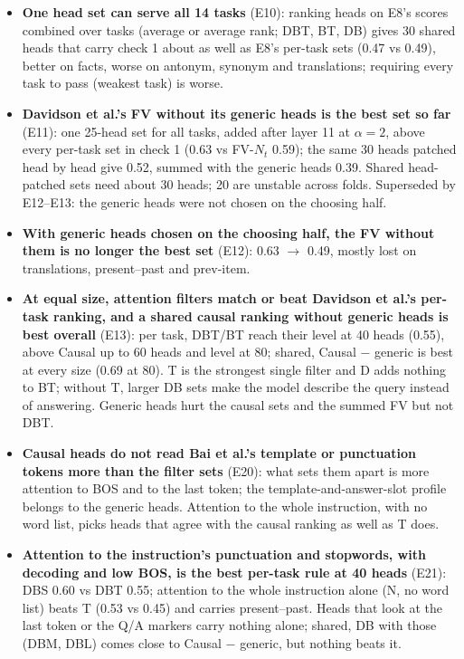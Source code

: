 \documentclass[10pt,a4paper]{article}
\newcommand{\yes}{\textcolor{green!45!black}{\ding{51}}}
\newcommand{\no}{\textcolor{red!70!black}{\ding{55}}}
\begin{document}
\begin{itemize}
\item \yes{} \textbf{One head set can serve all 14 tasks} (E10): ranking heads on E8's scores combined over tasks (average or average rank; DBT, BT, DB) gives 30 shared heads that carry check 1 about as well as E8's per-task sets (0.47 vs 0.49), better on facts, worse on antonym, synonym and translations; requiring every task to pass (weakest task) is worse.
\item \yes{} \textbf{Davidson et al.'s FV without its generic heads is the best set so far} (E11): one 25-head set for all tasks, added after layer 11 at $\alpha=2$, above every per-task set in check 1 (0.63 vs FV-$N_t$ 0.59); the same 30 heads patched head by head give 0.52, summed with the generic heads 0.39. Shared head-patched sets need about 30 heads; 20 are unstable across folds. Superseded by E12--E13: the generic heads were not chosen on the choosing half.
\item \no{} \textbf{With generic heads chosen on the choosing half, the FV without them is no longer the best set} (E12): 0.63 $\to$ 0.49, mostly lost on translations, present--past and prev-item.
\item \yes{} \textbf{At equal size, attention filters match or beat Davidson et al.'s per-task ranking, and a shared causal ranking without generic heads is best overall} (E13): per task, DBT/BT reach their level at 40 heads (0.55), above Causal up to 60 heads and level at 80; shared, Causal $-$ generic is best at every size (0.69 at 80). T is the strongest single filter and D adds nothing to BT; without T, larger DB sets make the model describe the query instead of answering. Generic heads hurt the causal sets and the summed FV but not DBT.
\item \no{} \textbf{Causal heads do not read Bai et al.'s template or punctuation tokens more than the filter sets} (E20): what sets them apart is more attention to BOS and to the last token; the template-and-answer-slot profile belongs to the generic heads. Attention to the whole instruction, with no word list, picks heads that agree with the causal ranking as well as T does.
\item \yes{} \textbf{Attention to the instruction's punctuation and stopwords, with decoding and low BOS, is the best per-task rule at 40 heads} (E21): DBS 0.60 vs DBT 0.55; attention to the whole instruction alone (N, no word list) beats T (0.53 vs 0.45) and carries present--past. Heads that look at the last token or the Q/A markers carry nothing alone; shared, DB with those (DBM, DBL) comes close to Causal $-$ generic, but nothing beats it.

\end{itemize}
\end{document}
